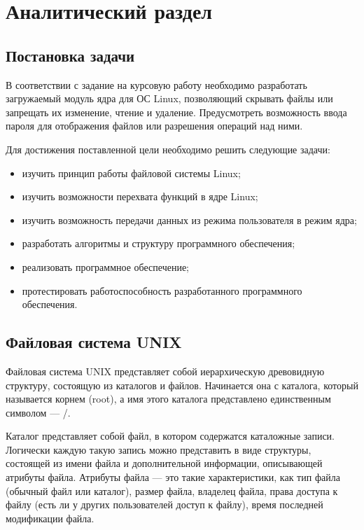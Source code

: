 \chapter{Аналитический раздел}
\label{cha:analysis}

\section{Постановка задачи}

В соответствии с задание на курсовую работу необходимо разработать загружаемый модуль ядра для ОС Linux, позволяющий скрывать файлы или запрещать их изменение, чтение и удаление. Предусмотреть возможность ввода пароля для отображения файлов или разрешения операций над ними.

Для достижения поставленной цели необходимо решить следующие задачи:

\begin{itemize}
	\item изучить принцип работы файловой системы Linux;
	\item изучить возможности перехвата функций в ядре Linux;
	\item изучить возможность передачи данных из режима пользователя в режим ядра;
	\item разработать алгоритмы и структуру программного обеспечения;
	\item реализовать программное обеспечение;
	\item протестировать работоспособность разработанного программного обеспечения.
\end{itemize}

\section{Файловая система UNIX}

Файловая система UNIX представляет собой иерархическую древовидную структуру, состоящую из каталогов и файлов. Начинается она с каталога, который называется корнем (root), а имя этого каталога представлено единственным символом --- /.

Каталог представляет собой файл, в котором содержатся каталожные записи. Логически каждую такую запись можно представить в виде структуры, состоящей из имени файла и дополнительной информации, описывающей атрибуты файла. Атрибуты файла --- это такие характеристики, как тип файла (обычный файл или каталог), размер файла, владелец файла, права доступа к файлу (есть ли у других пользователей доступ к файлу), время последней модификации файла.


